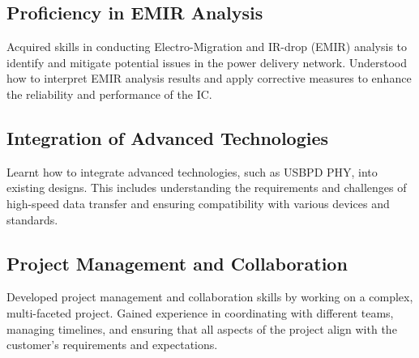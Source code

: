 \subsection{Proficiency in EMIR Analysis}
Acquired skills in conducting Electro-Migration and IR-drop (EMIR) analysis to identify and mitigate potential issues in the power delivery network. Understood how to interpret EMIR analysis results and apply corrective measures to enhance the reliability and performance of the IC.

\subsection{Integration of Advanced Technologies}
Learnt how to integrate advanced technologies, such as USBPD PHY, into existing designs. This includes understanding the requirements and challenges of high-speed data transfer and ensuring compatibility with various devices and standards.

\subsection{Project Management and Collaboration}

Developed project management and collaboration skills by working on a complex, multi-faceted project. Gained experience in coordinating with different teams, managing timelines, and ensuring that all aspects of the project align with the customer’s requirements and expectations.





























































